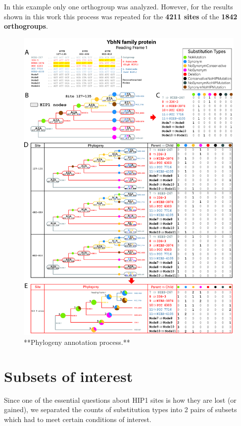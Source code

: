 \documentclass[
]{book}
\begin{document}
In this example only one orthogroup was analyzed. However, for the results shown in this work this process was repeated for the \textbf{4211 sites} of the \textbf{1842 orthogroups}.

\begin{figure}
\includegraphics[width=1\linewidth]{figures/4x/philogenies_annotation} \caption{**Phylogeny annotation process.**}\label{fig:FIG5x}
\end{figure}

\hypertarget{subsets-of-interest}{%
\section{Subsets of interest}\label{subsets-of-interest}}

Since one of the essential questions about HIP1 sites is how they are lost (or gained), we separated the counts of substitution types into 2 pairs of subsets which had to meet certain conditions of interest.
\end{document}
